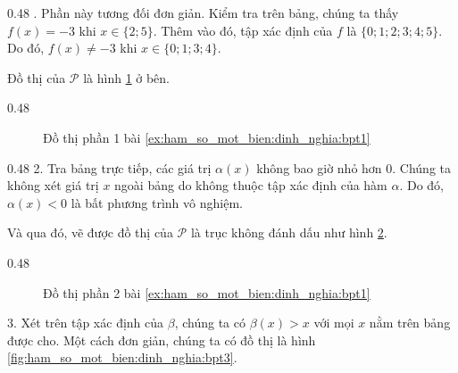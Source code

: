 {
   \begin{minipageindent}{0.48\textwidth}
      \setcounter{subexercise}{1}
      . Phần này tương đối đơn giản. Kiểm tra trên bảng, chúng ta thấy $f(x) = -3$ khi $x \in \{2; 5\}$. Thêm vào đó, tập xác định của $f$ là $\{0; 1; 2; 3; 4; 5\}$. Do đó, $f(x) \neq -3$ khi $x \in \{0; 1; 3; 4\}$. 

      Đồ thị của $\mathcal{P}$ là hình \ref{fig:ham_so_mot_bien:dinh_nghia:bpt1} ở bên.
   \end{minipageindent}
   \begin{minipageindent}{0.48\textwidth}
      \begin{figure}[H]
         \centering
         \caption{Đồ thị phần 1 bài \ref{ex:ham_so_mot_bien:dinh_nghia:bpt1}}
         \label{fig:ham_so_mot_bien:dinh_nghia:bpt1}
      \end{figure}
   \end{minipageindent}
}

{
   \begin{minipageindent}{0.48\textwidth}
      2. Tra bảng trực tiếp, các giá trị $\alpha(x)$ không bao giờ nhỏ hơn $0$. Chúng ta không xét giá trị $x$ ngoài bảng do không thuộc tập xác định của hàm $\alpha$. Do đó, $\alpha(x) < 0$ là bất phương trình vô nghiệm.

      Và qua đó, vẽ được đồ thị của $\mathcal{P}$ là trục không đánh dấu như hình \ref{fig:ham_so_mot_bien:dinh_nghia:bpt2}.
   \end{minipageindent}
   \begin{minipageindent}{0.48\textwidth}
      \begin{figure}[H]
         \centering
         \caption{Đồ thị phần 2 bài \ref{ex:ham_so_mot_bien:dinh_nghia:bpt1}}
         \label{fig:ham_so_mot_bien:dinh_nghia:bpt2}
      \end{figure}
   \end{minipageindent}
}

3. Xét trên tập xác định của $\beta$, chúng ta có $\beta(x) > x$ với mọi $x$ nằm trên bảng được cho. Một cách đơn giản, chúng ta có đồ thị là hình \ref{fig:ham_so_mot_bien:dinh_nghia:bpt3}.

